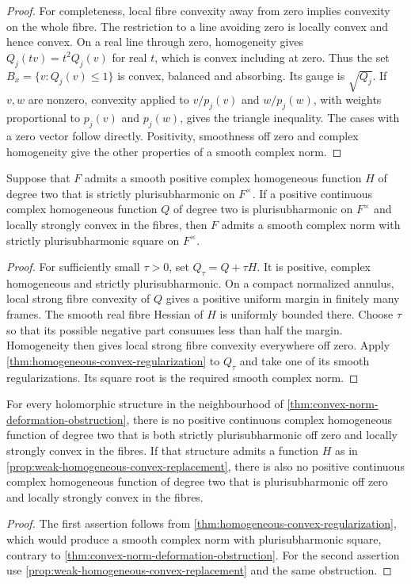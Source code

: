 \begin{proof}
For completeness, local fibre convexity away from zero implies convexity on the whole fibre. The restriction to a line avoiding zero is locally convex and hence convex. On a real line through zero, homogeneity gives $Q_j(tv)=t^2Q_j(v)$ for real $t$, which is convex including at zero. Thus the set $B_x=\{v:Q_j(v)\leq1\}$ is convex, balanced and absorbing. Its gauge is $\sqrt{Q_j}$. If $v,w$ are nonzero, convexity applied to $v/p_j(v)$ and $w/p_j(w)$, with weights proportional to $p_j(v)$ and $p_j(w)$, gives the triangle inequality. The cases with a zero vector follow directly. Positivity, smoothness off zero and complex homogeneity give the other properties of a smooth complex norm.
\end{proof}

\begin{proposition}\label{prop:weak-homogeneous-convex-replacement}
Suppose that $F$ admits a smooth positive complex homogeneous function $H$ of degree two that is strictly plurisubharmonic on $F^\times$. If a positive continuous complex homogeneous function $Q$ of degree two is plurisubharmonic on $F^\times$ and locally strongly convex in the fibres, then $F$ admits a smooth complex norm with strictly plurisubharmonic square on $F^\times$.
\end{proposition}
\begin{proof}
For sufficiently small $\tau>0$, set $Q_\tau=Q+\tau H$. It is positive, complex homogeneous and strictly plurisubharmonic. On a compact normalized annulus, local strong fibre convexity of $Q$ gives a positive uniform margin in finitely many frames. The smooth real fibre Hessian of $H$ is uniformly bounded there. Choose $\tau$ so that its possible negative part consumes less than half the margin. Homogeneity then gives local strong fibre convexity everywhere off zero. Apply \cref{thm:homogeneous-convex-regularization} to $Q_\tau$ and take one of its smooth regularizations. Its square root is the required smooth complex norm.
\end{proof}

\begin{corollary}\label{cor:continuous-convex-norm-obstruction}
For every holomorphic structure in the neighbourhood of \cref{thm:convex-norm-deformation-obstruction}, there is no positive continuous complex homogeneous function of degree two that is both strictly plurisubharmonic off zero and locally strongly convex in the fibres. If that structure admits a function $H$ as in \cref{prop:weak-homogeneous-convex-replacement}, there is also no positive continuous complex homogeneous function of degree two that is plurisubharmonic off zero and locally strongly convex in the fibres.
\end{corollary}
\begin{proof}
The first assertion follows from \cref{thm:homogeneous-convex-regularization}, which would produce a smooth complex norm with plurisubharmonic square, contrary to \cref{thm:convex-norm-deformation-obstruction}. For the second assertion use \cref{prop:weak-homogeneous-convex-replacement} and the same obstruction.
\end{proof}

